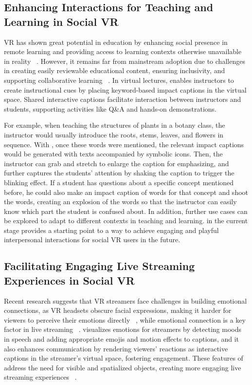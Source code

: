 \subsection{Enhancing Interactions for Teaching and Learning in Social VR}
VR has shown great potential in education by enhancing social presence in remote learning and providing access to learning contexts otherwise unavailable in reality ~\cite{thanyadit2022xr, peng2021exploring, jensen2018review}. However, it remains far from mainstream adoption due to challenges in creating easily reviewable educational content, ensuring inclusivity, and supporting collaborative learning ~\cite{jin2022will}.   
In virtual lectures, \system{} enables instructors to create instructional cues by placing keyword-based impact captions in the virtual space. Shared interactive captions facilitate interaction between instructors and students, supporting activities like Q\&A and hands-on demonstrations.

For example, when teaching the structures of plants in a botany class, the instructor would usually introduce the roots, stems, leaves, and flowers in sequence. With \system{}, once these words were mentioned, the relevant impact captions would be generated with texts accompanied by symbolic icons.
Then, the instructor can grab and stretch to enlarge the caption for emphasizing, and further captures the students' attention by shaking the caption to trigger the blinking effect.
If a student has questions about a specific concept mentioned before, he could also make an impact caption of words for that concept and shoot the words, creating an explosion of the words so that the instructor can easily know which part the student is confused about. 
In addition, further use cases can be explored to adapt to different contexts in teaching and learning. \system{} in the current stage provides a starting point to a way to achieve engaging and playful interpersonal interactions for social VR users in the future.


\subsection{Facilitating Engaging Live Streaming Experiences in Social VR}
Recent research suggests that VR streamers face challenges in building emotional connections, as VR headsets obscure facial expressions, making it harder for viewers to perceive their emotions directly ~\cite{wu2023interactions}, while emotional connection is a key factor in live streaming ~\cite{lu2018you}.
\system{} visualizes emotions for streamers by detecting moods in speech and adding appropriate emojis and motion effects to captions, and it also enhances communication by rendering viewers’ reactions as interactive captions in the streamer’s virtual space, fostering engagement.
These features of \system{} address the need for visible and spatialized objects, creating more engaging live streaming experiences ~\cite{wu2023interactions, lu2018you}.

